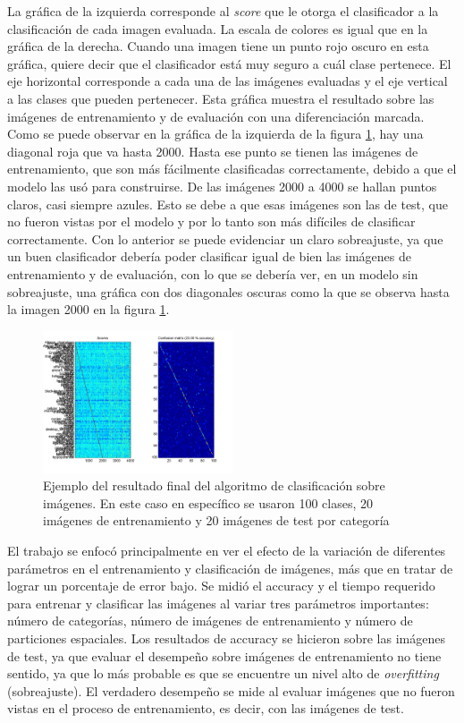 \documentclass[10pt,twocolumn,letterpaper]{article}
\begin{document}
La gráfica de la izquierda corresponde al \textit{score} que le otorga el clasificador a la clasificación de cada imagen evaluada. La escala de colores es igual que en la gráfica de la derecha. Cuando una imagen tiene un punto rojo oscuro en esta gráfica, quiere decir que el clasificador está muy seguro a cuál clase pertenece. El eje horizontal corresponde a cada una de las imágenes evaluadas y el eje vertical a las clases que pueden pertenecer. Esta gráfica muestra el resultado sobre las imágenes de entrenamiento y de evaluación con una diferenciación marcada. Como se puede observar en la gráfica de la izquierda de la figura \ref{fig:resultado}, hay una diagonal roja que va hasta 2000. Hasta ese punto se tienen las imágenes de entrenamiento, que son más fácilmente clasificadas correctamente, debido a que el modelo las usó para construirse. De las imágenes 2000 a 4000 se hallan puntos claros, casi siempre azules. Esto se debe a que esas imágenes son las de test, que no fueron vistas por el modelo y por lo tanto son más difíciles de clasificar correctamente. Con lo anterior se puede evidenciar un claro sobreajuste, ya que un buen clasificador debería poder clasificar igual de bien las imágenes de entrenamiento y de evaluación, con lo que se debería ver, en un modelo sin sobreajuste, una gráfica con dos diagonales oscuras como la que se observa hasta la imagen 2000 en la figura \ref{fig:resultado}.

\begin{figure}[h]
    \centering
    \includegraphics[width=0.5\textwidth]{Resultados.jpg}
    \caption{Ejemplo del resultado final del algoritmo de clasificación sobre imágenes. En este caso en específico se usaron 100 clases, 20 imágenes de entrenamiento y 20 imágenes de test por categoría}
    \label{fig:resultado}
\end{figure}

El trabajo se enfocó principalmente en ver el efecto de la variación de diferentes parámetros en el entrenamiento y clasificación de imágenes, más que en tratar de lograr un porcentaje de error bajo. Se midió el accuracy y el tiempo requerido para entrenar y clasificar las imágenes al variar tres parámetros importantes: número de categorías, número de imágenes de entrenamiento y número de particiones espaciales. Los resultados de accuracy se hicieron sobre las imágenes de test, ya que evaluar el desempeño sobre imágenes de entrenamiento no tiene sentido, ya que lo más probable es que se encuentre un nivel alto de \textit{overfitting} (sobreajuste). El verdadero desempeño se mide al evaluar imágenes que no fueron vistas en el proceso de entrenamiento, es decir, con las imágenes de test.
\end{document}
